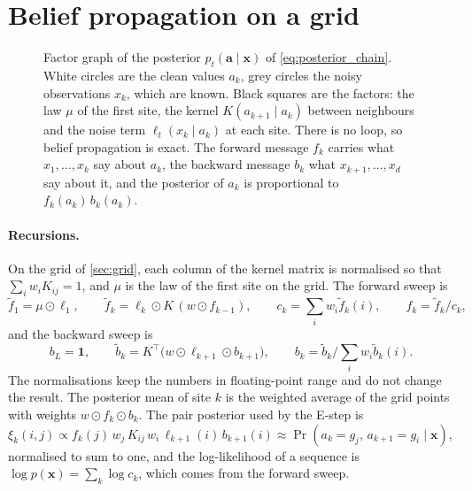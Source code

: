\documentclass{article}
\begin{document}
\section{Belief propagation on a grid}
\label{app:bp}

\begin{figure}[!htbp]
  \centering
  
  \caption{Factor graph of the posterior $p_t(\mathbf a\mid\mathbf x)$ of \cref{eq:posterior_chain}. White circles are
  the clean values $a_k$, grey circles the noisy observations $x_k$, which are known. Black squares are the factors: the
  law $\mu$ of the first site, the kernel $K(a_{k+1}\mid a_k)$ between neighbours and the noise term
  $\ell_t(x_k\mid a_k)$ at each site. There is no loop, so belief propagation is exact. The forward message $f_k$ carries
  what $x_1,\ldots,x_k$ say about $a_k$, the backward message $b_k$ what $x_{k+1},\ldots,x_d$ say about it, and the
  posterior of $a_k$ is proportional to $f_k(a_k)\,b_k(a_k)$.}
  \label{fig:factor-graph}
\end{figure}

\paragraph{Recursions.} On the grid of \cref{sec:grid}, each column of the kernel matrix is normalised so that
$\sum_iw_iK_{ij}=1$, and $\mu$ is the law of the first site on the grid. The forward sweep is
\begin{equation}
  \tilde f_1=\mu\odot\ell_1,\qquad
  \tilde f_k=\ell_k\odot K\,(w\odot f_{k-1}),\qquad
  c_k=\sum_iw_i\tilde f_k(i),\qquad f_k=\tilde f_k/c_k ,
\end{equation}
and the backward sweep is
\begin{equation}
  b_L=\mathbf 1,\qquad
  \tilde b_k=K^{\top}\big(w\odot\ell_{k+1}\odot b_{k+1}\big),\qquad
  b_k=\tilde b_k\big/\textstyle\sum_iw_i\tilde b_k(i).
\end{equation}
The normalisations keep the numbers in floating-point range and do not change the result. The posterior mean of site
$k$ is the weighted average of the grid points with weights $w\odot f_k\odot b_k$. The pair posterior used by the E-step
is
\begin{equation}
  \xi_k(i,j)\propto f_k(j)\,w_j\,K_{ij}\,w_i\,\ell_{k+1}(i)\,b_{k+1}(i)
  \approx\Pr(a_k=g_j,\,a_{k+1}=g_i\mid\mathbf x),
\end{equation}
normalised to sum to one, and the log-likelihood of a sequence is $\log p(\mathbf x)=\sum_k\log c_k$, which comes from the forward sweep.
\end{document}
